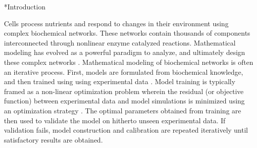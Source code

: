 \documentclass[12pt]{article}
\makeatletter
\renewcommand\section{\@startsection
	{subsection}{2}{0mm}
	{-0.2in}
	{0.05\baselineskip}
	{\normalfont\large\bfseries}}
\makeatother
\begin{document}

\pagebreak

\setcounter{page}{1}

\linenumbers


\section*{Introduction}

Cells process nutrients and respond to changes in their environment using complex biochemical networks. These networks contain thousands of components
interconnected through nonlinear enzyme catalyzed reactions. Mathematical modeling has evolved as a powerful paradigm to analyze, and ultimately design these complex networks \cite{assmus2006dynamics, Riel:2006aa,Jaqaman:2006aa,kitano2002systems,hood2004systems}. Mathematical modeling of biochemical networks is often an iterative process.
First, models are formulated from biochemical knowledge, and then trained using using experimental data \cite{Aldridge:2006aa,banga2008optimization,ashyraliyev2009systems}.
Model training is typically framed as a non-linear optimization problem wherein the residual (or objective function) between experimental data and model simulations is minimized using an optimization strategy \cite{moles2003parameter}. The optimal parameters obtained from training are then used to validate the model on hitherto unseen experimental data. If validation fails, model construction and calibration are repeated iteratively until satisfactory results are obtained.
\end{document}
